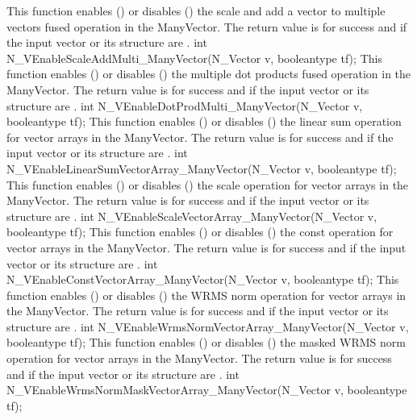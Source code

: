 {
  This function enables () or disables () the scale and
  add a vector to multiple vectors fused operation in the ManyVector. The
  return value is  for success and  if the input vector or its
   structure are .
}
{
  int N\_VEnableScaleAddMulti\_ManyVector(N\_Vector v, booleantype tf);
}
{
  This function enables () or disables () the multiple
  dot products fused operation in the ManyVector. The return value is 
  for success and  if the input vector or its  structure are
  .
}
{
  int N\_VEnableDotProdMulti\_ManyVector(N\_Vector v, booleantype tf);
}
{
  This function enables () or disables () the linear sum
  operation for vector arrays in the ManyVector. The return value is  for
  success and  if the input vector or its  structure are .
}
{
  int N\_VEnableLinearSumVectorArray\_ManyVector(N\_Vector v, booleantype tf);
}
{
  This function enables () or disables () the scale
  operation for vector arrays in the ManyVector. The return value is  for
  success and  if the input vector or its  structure are .
}
{
  int N\_VEnableScaleVectorArray\_ManyVector(N\_Vector v, booleantype tf);
}
{
  This function enables () or disables () the const
  operation for vector arrays in the ManyVector. The return value is  for
  success and  if the input vector or its  structure are .
}
{
  int N\_VEnableConstVectorArray\_ManyVector(N\_Vector v, booleantype tf);
}
{
  This function enables () or disables () the WRMS norm
  operation for vector arrays in the ManyVector. The return value is  for
  success and  if the input vector or its  structure are .
}
{
  int N\_VEnableWrmsNormVectorArray\_ManyVector(N\_Vector v, booleantype tf);
}
{
  This function enables () or disables () the masked WRMS
  norm operation for vector arrays in the ManyVector. The return value is
   for success and  if the input vector or its  structure are
  .
}
{
  int N\_VEnableWrmsNormMaskVectorArray\_ManyVector(N\_Vector v, booleantype tf);
}
